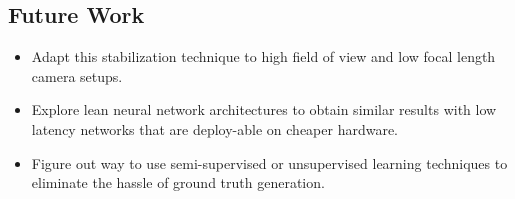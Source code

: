 \subsection{Future Work}
\begin{itemize}
    \item Adapt this stabilization technique to high field of view and low focal length camera setups.

    \item Explore lean neural network architectures to obtain similar results with low latency networks that are deploy-able on cheaper hardware.

    \item Figure out way to use semi-supervised or unsupervised learning techniques to eliminate the hassle of ground truth generation.
    
\end{itemize}
